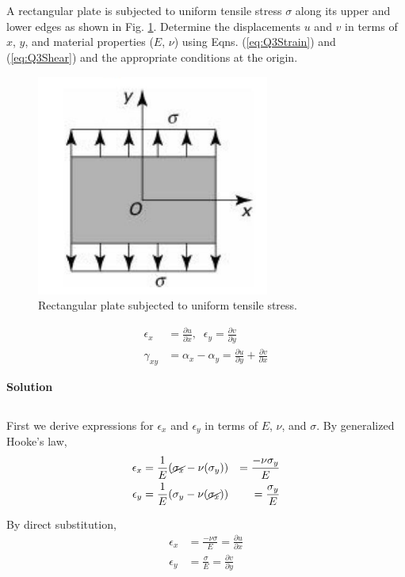 \section{}
A rectangular plate is subjected to uniform tensile stress $\sigma$ along its upper and 
lower edges as shown in Fig. \ref{fig:Q3}. Determine the displacements $u$ and $v$ in terms 
of $x$, $y$, and material properties ($E$, $\nu$) using Eqns. (\ref{eq:Q3Strain}) and (\ref{eq:Q3Shear}) and the appropriate 
conditions at the origin.

\begin{figure}[h]
    \centering
    \includegraphics[width=0.3\linewidth]{Questions/Figures/Q3ProblemDiagram.png}
    \caption{Rectangular plate subjected to uniform tensile stress.}
    \label{fig:Q3}
\end{figure}

\begin{align}
    \epsilon_x &= \frac{\partial u}{\partial x}, \;\; \epsilon_y = \frac{\partial v}{\partial y} \label{eq:Q3Strain} \\
    \gamma_{xy} &= \alpha_x - \alpha_y = \frac{\partial u}{\partial y} + \frac{\partial v}{\partial x} \label{eq:Q3Shear}
\end{align}

\textbf{Solution}
\subsection{}

First we derive expressions for $\epsilon_x$ and $\epsilon_y$ in terms of $E$, $\nu$, and $\sigma$. By generalized Hooke's law,
\[
\begin{aligned}
    \epsilon_x &= \frac{1}{E} (\cancel{\sigma_x} - \nu(\sigma_y))
    &= \frac{-\nu\sigma_y}{E} \\
    \epsilon_y &= \frac{1}{E} (\sigma_y- \nu( \cancel{\sigma_x}))
    &= \frac{\sigma_y}{E} \\
\end{aligned}
\]

By direct substitution,
\[
\begin{aligned}
    \epsilon_x &= \frac{-\nu\sigma}{E} = \frac{\partial u}{\partial x} \\
    \epsilon_y &= \frac{\sigma}{E} = \frac{\partial v}{\partial y} \\
\end{aligned}
\]

